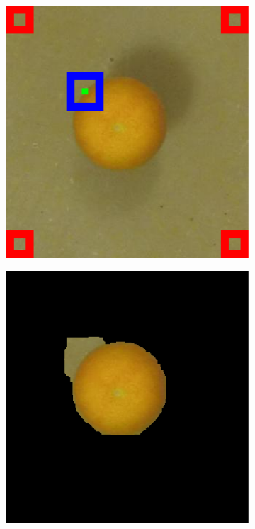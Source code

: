 \documentclass {udthesis}
\begin{document}
%
%
\begin{figure}
  \centering
  \begin{subfigure}[]{0.2\textwidth}
      \includegraphics[width=\textwidth]{distdes_annotation_good_visualattn_seeds}
      \caption{}
      \label{fig:good_seg_visualattn_seeds}
  \end{subfigure}
  \begin{subfigure}[]{0.2\textwidth}
      \includegraphics[width=\textwidth]{distdes_annotation_good_visualattn_segment}

\end{subfigure}
\end{figure}
\end{document}
